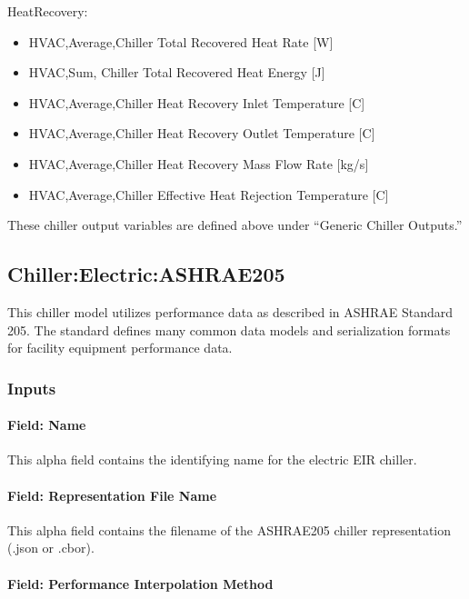 HeatRecovery:

\begin{itemize}
    \item
    HVAC,Average,Chiller Total Recovered Heat Rate {[}W{]}
    \item
    HVAC,Sum, Chiller Total Recovered Heat Energy {[}J{]}
    \item
    HVAC,Average,Chiller Heat Recovery Inlet Temperature {[}C{]}
    \item
    HVAC,Average,Chiller Heat Recovery Outlet Temperature {[}C{]}
    \item
    HVAC,Average,Chiller Heat Recovery Mass Flow Rate {[}kg/s{]}
    \item
    HVAC,Average,Chiller Effective Heat Rejection Temperature {[}C{]}
\end{itemize}

These chiller output variables are defined above under ``Generic Chiller Outputs.''

\subsection{Chiller:Electric:ASHRAE205}\label{chillerelectricashrae205}

This chiller model utilizes performance data as described in ASHRAE Standard 205. The standard defines many common data models and serialization formats for facility equipment performance data.

\subsubsection{Inputs}

\paragraph{Field: Name}

This alpha field contains the identifying name for the electric EIR chiller.

\paragraph{Field: Representation File Name}\label{field-chiller205-representation-file-name}

This alpha field contains the filename of the ASHRAE205 chiller representation (.json or .cbor).

\paragraph{Field: Performance Interpolation Method}\label{field-chiller205-performance-interpolation-method}

